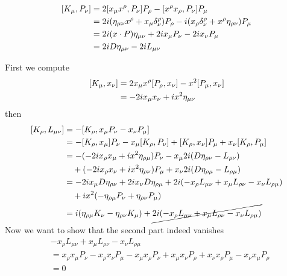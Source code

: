 \begin{enumerate}
		\begin{align}
			\comm{K_\mu}{P_\nu} &= 2 \comm{x_\mu x^\rho}{P_\nu} P_\rho - \comm{x^\rho x_\rho}{P_\nu} P_\mu  \notag \\
									  &= 2 i (\eta_{\mu\nu}x^\rho + x_\mu \delta_\nu^\rho) P_\rho - i( x_\rho \delta^\rho_\nu + x^\rho \eta_{\rho\nu}) P_\mu \notag \\
									  &= 2i (x\cdot P) \eta_{\mu\nu} + 2i x_\mu P_\nu -2i x_\nu P_\mu \notag \\
									  &= 2i D \eta_{\mu\nu} -2i L_{\mu\nu}
		\end{align}
		
		First we compute
		\begin{align}
			\comm{K_\mu}{x_\nu} &= 2x_\mu x^\rho \comm{P_\rho}{x_\nu} - x^2 \comm{P_\mu}{x_\nu} \notag \\
									  &= -2i x_\mu x_\nu   + i x^2 \eta_{\mu\nu}
		\end{align}
		then
		\begin{align}
			\comm{K_\rho}{L_{\mu\nu}} &= - \comm{K_\rho}{x_\mu P_\nu - x_\nu P_\mu} \notag \\
											  &= -\comm{K_\rho}{x_\mu} P_\nu - x_\mu\comm{K_\rho}{P_\nu} + \comm{K_\rho}{x_\nu} P_\mu + x_\nu \comm{K_\rho}{P_\mu} \notag \\
											  &= - (-2i x_\rho x_\mu + ix^2 \eta_{\rho\mu}) P_\nu - x_\mu 2i(D\eta_{\rho\nu} - L_{\rho\nu}) \notag \\
											  &\quad + (-2ix_\rho x_\nu + i x^2 \eta_{\rho\nu}) P_\mu + x_\nu 2i(D \eta_{\rho\mu} - L_{\rho\mu}) \notag \\
											  &= 	-2i x_\mu D \eta_{\rho\nu} + 2i x_\nu D \eta_{\rho\mu} + 2i  (- x_\rho L_{\mu\nu} + x_\mu L_{\rho\nu} - x_\nu L_{\rho\mu})  \notag \\
											  &\quad + ix^2 (-\eta_{\rho\mu}P_\nu + \eta_{\rho\nu}P_\mu) \notag \\
											  &= i (\eta_{\rho\mu}K_\nu - \eta_{\rho\nu} K_\mu) + \cancel{2i  (- x_\rho L_{\mu\nu} + x_\mu L_{\rho\nu} - x_\nu L_{\rho\mu})}
		\end{align}
		Now we want to show that the second part indeed vanishes
		\begin{align*}
			&- x_\rho L_{\mu\nu} + x_\mu L_{\rho\nu} - x_\nu L_{\rho\mu} \\
			&= x_\rho x_\mu P_\nu - x_\rho x_\nu P_\mu - x_\mu x_\rho P_\nu + x_\mu x_\nu P_\rho + x_\nu x_\rho P_\mu - x_\nu x_\mu P_\rho \\
			&= 0
		\end{align*}


\end{enumerate}
